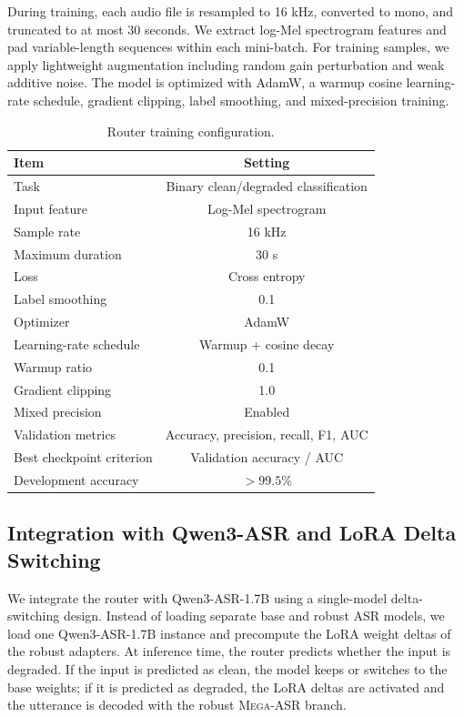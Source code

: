\documentclass{article}
\begin{document}
During training, each audio file is resampled to 16 kHz, converted to mono, and
truncated to at most 30 seconds. We extract log-Mel spectrogram features and pad
variable-length sequences within each mini-batch. For training samples, we apply
lightweight augmentation including random gain perturbation and weak additive
noise. The model is optimized with AdamW, a warmup cosine learning-rate schedule,
gradient clipping, label smoothing, and mixed-precision training.

\begin{table}[t]
\centering
\small
\caption{Router training configuration.}
\label{tab:router_training_config}
\begin{tabular}{lc}
\toprule
\textbf{Item} & \textbf{Setting} \\
\midrule
Task & Binary clean/degraded classification \\
Input feature & Log-Mel spectrogram \\
Sample rate & 16 kHz \\
Maximum duration & 30 s \\
Loss & Cross entropy \\
Label smoothing & 0.1 \\
Optimizer & AdamW \\
Learning-rate schedule & Warmup + cosine decay \\
Warmup ratio & 0.1 \\
Gradient clipping & 1.0 \\
Mixed precision & Enabled \\
Validation metrics & Accuracy, precision, recall, F1, AUC \\
Best checkpoint criterion & Validation accuracy / AUC \\
Development accuracy & $>99.5\%$ \\
\bottomrule
\end{tabular}
\end{table}

\subsection{Integration with Qwen3-ASR and LoRA Delta Switching}

We integrate the router with Qwen3-ASR-1.7B using a single-model delta-switching
design. Instead of loading separate base and robust ASR models, we load one
Qwen3-ASR-1.7B instance and precompute the LoRA weight deltas of the robust
adapters. At inference time, the router predicts whether the input is degraded.
If the input is predicted as clean, the model keeps or switches to the base
weights; if it is predicted as degraded, the LoRA deltas are activated and the
utterance is decoded with the robust \textsc{Mega-ASR} branch.
\end{document}
